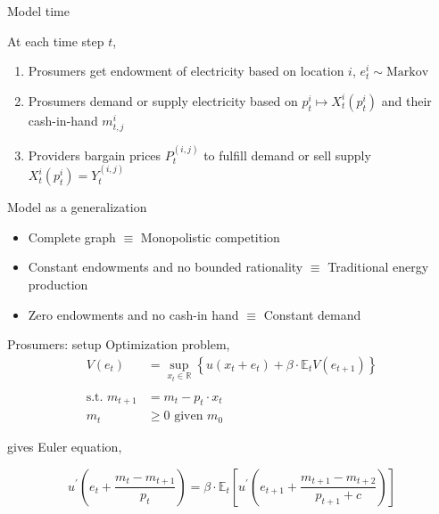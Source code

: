 \documentclass[xcolor={svgnames}]{beamer}
\newcommand{\E}{\mathbb{E}}
\newcommand{\R}{\mathbb{R}}
\begin{document}
\begin{frame} {Model time}
    \begin{minipage}{0.45\textwidth}
        \resizebox{\textwidth}{!}{}
    \end{minipage}
    \hfill
    \begin{minipage}{0.5\textwidth}
        At each time step $t$,
        \vspace{1em}
        \begin{enumerate} \setlength{\itemsep}{1em}
            \item Prosumers get endowment of electricity based on location $i$, $e^i_t \sim \text{Markov}$
            \item Prosumers demand or supply electricity based on $p^i_t \mapsto X^i_t(p^i_t)$ and their cash-in-hand $m^i_{t, j}$
            \item Providers bargain prices $P_t^{(i, j)}$ to fulfill demand or sell supply $ X^i_t(p^i_t) = Y_t^{(i, j)}$
        \end{enumerate}
    \end{minipage}
\end{frame}

\begin{frame}{Model as a generalization}
    \begin{itemize}\setlength{\itemsep}{1em}
        \item Complete graph $\equiv$ Monopolistic competition
        \item Constant endowments and no bounded rationality $\equiv$ Traditional energy production
        \item Zero endowments and no cash-in hand $\equiv$ Constant demand
    \end{itemize}
\end{frame}

\begin{frame}{Prosumers: setup}
    Optimization problem,
    \begin{equation*}
        \begin{split}
            V(e_t) &= \sup_{x_t \in \R} \left\{u(x_t + e_t) + \beta \cdot \E_t V( e_{t+1} ) \right\} \\
            \\
            \text{s.t. } m_{t+1} &= m_{t} - p_{t} \cdot x_{t}\\
            m_t  &\geq 0 \text{ given } m_0
        \end{split}
    \end{equation*}

    gives Euler equation,

    \begin{equation*}
        u^\prime\left( e_t + \frac{m_t - m_{t+1}}{p_t} \right) = \beta \cdot \E_t \left[ u^\prime\left(e_{t+1} + \frac{m_{t+1} - m_{t+2}}{ p_{t+1} + c} \right)  \right]
    \end{equation*}
\end{frame}
\end{document}
